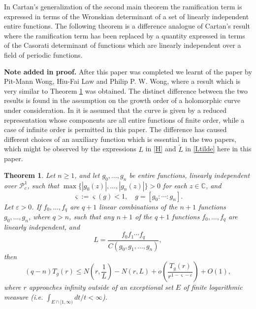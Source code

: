 \documentclass{amsart}
\newcommand{\C}{\mathbb{C}}
\newtheorem{theorem}{Theorem}%
\theoremstyle{definition}
\numberwithin{equation}{section}
\numberwithin{theorem}{section}
\begin{document}
In Cartan's generalization of the second main theorem the
ramification term is expressed in terms of the Wronskian
determinant of a set of linearly independent entire functions. The
following theorem is a difference analogue of Cartan's result
where the ramification term has been replaced by a quantity
expressed in terms of the Casorati determinant of functions which
are linearly independent over a field of periodic functions.

\medskip

\noindent\textbf{Note added in proof. } After this paper was completed we learnt of the paper \cite{wonglw:09} by Pit-Mann Wong, Hiu-Fai Law and Philip P. W. Wong, where a result which is very similar to Theorem \ref{casorati} was obtained. The distinct difference between the two results is found in the assumption on the growth order of a holomorphic curve under consideration. In \cite{wonglw:09} it is assumed that the curve is given by a reduced representation whose components are all entire functions of finite order, while a case of infinite order is permitted in this paper. The difference has caused different choices of an auxiliary function which is essential in the two papers, which might be observed by the expressions $L$ in \eqref{H} and $\tilde{L}$ in \eqref{Ltilde} here in this paper.

\medskip

\begin{theorem}\label{casorati}
Let $n\geq 1$, and let $g_0,\ldots,g_n$ be entire functions,
linearly independent over $\mathcal{P}^1_c$, such that
$\max\{|g_0(z)|,\ldots,|g_n(z)|\}>0$ for each $z\in\C$, and
    \begin{equation}\label{growth}
    \varsigma:=\varsigma(g)<1,\quad
    g=[g_0:\cdots:g_n].
    \end{equation}
Let $\varepsilon>0$. If $f_0,\ldots,f_q$ are $q+1$ linear
combinations of the $n+1$ functions
$g_0,\ldots,g_n$, where $q>n$, such that any $n+1$ of the $q+1$
functions $f_0,\ldots,f_q$ are linearly independent, and
    \begin{equation}\label{H}
    L=\frac{f_0f_1\cdots
    f_q}{C(g_0,g_1,\ldots,g_n)},
    \end{equation}
then
    \begin{equation}\label{casoratiineq}
    (q-n)T_g(r)\leq
    N\left(r,\frac{1}{L}\right)-N(r,L)+o\left(\frac{T_g(r)}{r^{1-\varsigma-\varepsilon}}\right)+O(1),
    \end{equation}
where $r$ approaches infinity outside of an exceptional set $E$ of finite
logarithmic measure (i.e. $\int_{E\cap[1,\infty)} dt/t <\infty$).
\end{theorem}
\end{document}
